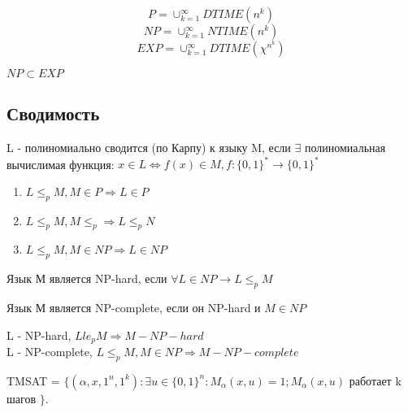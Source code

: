 	$$P = \cup_{k=1}^\infty DTIME (n^k)$$
	$$NP = \cup_{k=1}^\infty NTIME(n^k)$$
	$$EXP=\cup_{k=1}^\infty DTIME(\chi^{n^k})$$
	
	\begin{theorem}
		$NP \subset EXP$
	\end{theorem}
	
	\subsection{Сводимость}
	
	\begin{definition}
		L - полиномиально сводится  (по Карпу) к языку M, если $\exists$ полиномиальная вычислимая функция:
		$x \in L \Leftrightarrow f(x) \in M, f: \{0,1\}^* \to \{0,1\}^*$
	\end{definition}
	
	\begin{statement}
		\begin{enumerate}
			\item $L \le_p M, M \in P \Rightarrow L \in P$
			\item $L \le_p M, M \le_p \Rightarrow L \le_p N$
			\item $L \le_p M, M \in NP \Rightarrow L \in NP$
		\end{enumerate}
	\end{statement}
	
	\begin{definition}
		Язык М является NP-hard, если $\forall L \in NP \to L \le_p M$
	\end{definition}
	
	\begin{definition}
		Язык М является NP-complete, если он NP-hard и $M \in NP$
	\end{definition}
	
	\begin{statement}
		L - NP-hard, $L le_p M \Rightarrow  M -NP-hard$\\
		L - NP-complete, $L \le_p M, M \in NP \Rightarrow M - NP-complete$
	\end{statement}
	
	\begin{definition}
		TMSAT = $\{(\alpha,x,1^n,1^k) : \exists u \in \{0,1\}^n : M_{\alpha}(x,u) = 1;  M_{\alpha}(x,u)$ работает k шагов $\}$. 
	\end{definition}
	
